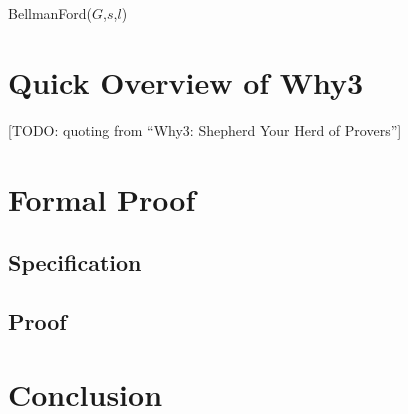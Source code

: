\documentclass[a4paper,12pt]{article}
\begin{document}
\begin{algorithm}
\caption{BellmanFord($G$,$s$,$l$)}
\begin{algorithmic}
\ENDFOR
\ENDFOR
{}
\ENDIF
\ENDFOR
{}
\end{algorithmic}
\end{algorithm}


\section{Quick Overview of Why3}

[TODO: quoting from ``Why3: Shepherd Your Herd of Provers'']

\section{Formal Proof}

\subsection{Specification}

\subsection{Proof}

\section{Conclusion}
\end{document}
